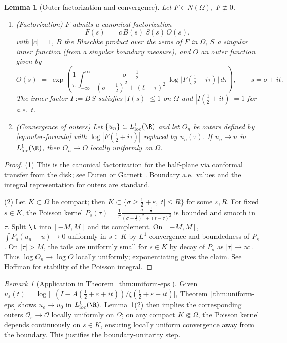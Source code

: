 \documentclass[11pt]{article}
\newtheorem{lemma}[theorem]{Lemma}
\theoremstyle{remark}
\newtheorem{remark}[theorem]{Remark}
\DeclareMathOperator{\dettwo}{det_2}
\begin{document}
\begin{lemma}[Outer factorization and convergence] \label{lem:outer-factorization}
Let $F\in N(\Omega)$, $F\not\equiv 0$.
\begin{enumerate}
 \item (Factorization) $F$ admits a canonical factorization
 \[
  F(s)\;=\;c\,B(s)\,S(s)\,O(s),
 \]
 with $|c|=1$, $B$ the Blaschke product over the zeros of $F$ in $\Omega$, $S$ a singular inner function (from a singular boundary measure), and $O$ an outer function given by
 \begin{equation}\label{eq:outer-formula}
  O(s)\;=\;\exp\!\left( \frac{1}{\pi} \int_{-\infty}^{\infty} \frac{\sigma-\tfrac12}{(\sigma-\tfrac12)^2+(t-\tau)^2}\,\log\big|F(\tfrac12+i\tau)\big|\,d\tau \right),\qquad s=\sigma+it.
 \end{equation}
 The inner factor $I:=B\,S$ satisfies $|I(s)|\le 1$ on $\Omega$ and $|I(\tfrac12+it)|=1$ for a.e.~$t$.
 \item (Convergence of outers) Let $\{u_n\}\subset L^1_{\mathrm{loc}}(\R)$ and let $O_n$ be outers defined by \eqref{eq:outer-formula} with $\log|F(\tfrac12+i\tau)|$ replaced by $u_n(\tau)$. If $u_n\to u$ in $L^1_{\mathrm{loc}}(\R)$, then $O_n\to O$ locally uniformly on $\Omega$.
\end{enumerate}
\end{lemma}
\begin{proof}
(1) This is the canonical factorization for the half-plane via conformal transfer from the disk; see Duren \cite[Ch.~2]{DurenHp} or Garnett \cite[Ch.~II]{Garnett}. Boundary a.e.~values and the integral representation for outers are standard.

(2) Let $K\subset\Omega$ be compact; then $K\subset\{\sigma\ge\tfrac12+\varepsilon, |t|\le R\}$ for some $\varepsilon,R$. For fixed $s\in K$, the Poisson kernel $P_s(\tau)=\frac{1}{\pi}\frac{\sigma-\tfrac12}{(\sigma-\tfrac12)^2+(t-\tau)^2}$ is bounded and smooth in $\tau$. Split $\R$ into $[-M,M]$ and its complement. On $[-M,M]$, $\int P_s(u_n-u)\to 0$ uniformly in $s\in K$ by $L^1$ convergence and boundedness of $P_s$. On $|\tau|>M$, the tails are uniformly small for $s\in K$ by decay of $P_s$ as $|\tau|\to\infty$. Thus $\log O_n\to \log O$ locally uniformly; exponentiating gives the claim. See Hoffman \cite[Ch.~3]{Hoffman} for stability of the Poisson integral.
\end{proof}

\begin{remark}[Application in Theorem~\ref{thm:uniform-eps}]
Given $u_\varepsilon(t)=\log\big|\dettwo(I-A(\tfrac12+\varepsilon+it))/\xi(\tfrac12+\varepsilon+it)\big|$, Theorem~\ref{thm:uniform-eps} shows $u_\varepsilon\to u_0$ in $L^1_{\mathrm{loc}}(\R)$. Lemma~\ref{lem:outer-factorization}(2) then implies the corresponding outers $\mathcal O_\varepsilon\to\mathcal O$ locally uniformly on $\Omega$; on any compact $K\Subset\Omega$, the Poisson kernel depends continuously on $s\in K$, ensuring locally uniform convergence away from the boundary. This justifies the boundary-unitarity step.
\end{remark}
\end{document}
